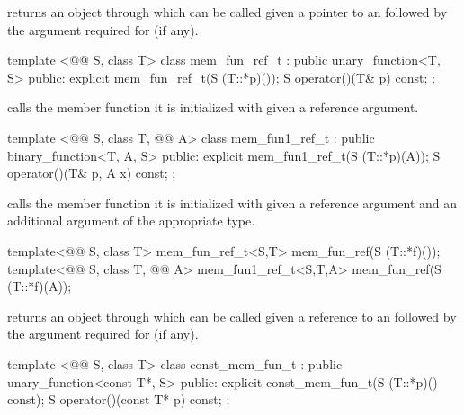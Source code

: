 \documentclass[american,twoside]{book}
\begin{document}
\begin{itemdescr}
\pnum
{} returns an object through which  can be
called given a pointer to an  followed by the argument required for
 (if any).
\end{itemdescr}

%
\begin{itemdecl}
template <@@ S, class T> class mem_fun_ref_t
      : public unary_function<T, S> {
public:
  explicit mem_fun_ref_t(S (T::*p)());
  S operator()(T& p) const;
};
\end{itemdecl}

\begin{itemdescr}
\pnum
{} calls the member function it is initialized with given
a reference argument.
\end{itemdescr}

%
\begin{itemdecl}
template <@@ S, class T, @@ A> class mem_fun1_ref_t
      : public binary_function<T, A, S> {
public:
  explicit mem_fun1_ref_t(S (T::*p)(A));
  S operator()(T& p, A x) const;
};
\end{itemdecl}

\begin{itemdescr}
\pnum
{} calls the member function it is initialized with
given a reference argument and an additional argument of the appropriate type.
\end{itemdescr}

%
\begin{itemdecl}
template<@@ S, class T> mem_fun_ref_t<S,T>
   mem_fun_ref(S (T::*f)());
template<@@ S, class T, @@ A> mem_fun1_ref_t<S,T,A>
   mem_fun_ref(S (T::*f)(A));
\end{itemdecl}

\begin{itemdescr}
\pnum
{} returns an object through which 
can be called given a reference to an  followed by the argument
required for  (if any).
\end{itemdescr}

%
\begin{itemdecl}
template <@@ S, class T> class const_mem_fun_t
      : public unary_function<const T*, S> {
public:
  explicit const_mem_fun_t(S (T::*p)() const);
  S operator()(const T* p) const;
};
\end{itemdecl}
\end{document}
